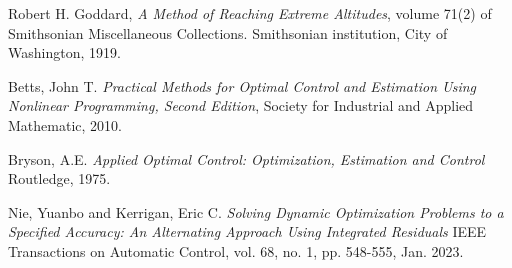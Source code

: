 \documentclass{article}
\begin{document}
\begin{thebibliography}{99}
    Robert H. Goddard,
    \textit{A Method of Reaching Extreme Altitudes},
    volume 71(2) of Smithsonian Miscellaneous Collections. Smithsonian institution, City of Washington, 1919.
    
    Betts, John T.
    \textit{Practical Methods for Optimal Control and Estimation Using Nonlinear Programming,  Second Edition},
    Society for Industrial and Applied Mathematic, 2010.
    
    Bryson, A.E.
    \textit{Applied Optimal Control: Optimization, Estimation and Control}
    Routledge, 1975.
    
    Nie, Yuanbo and Kerrigan, Eric C.
    \textit{Solving Dynamic Optimization Problems to a Specified Accuracy: An Alternating Approach Using Integrated Residuals}
    IEEE Transactions on Automatic Control, vol. 68, no. 1, pp. 548-555, Jan. 2023.
\end{thebibliography}
\end{document}
